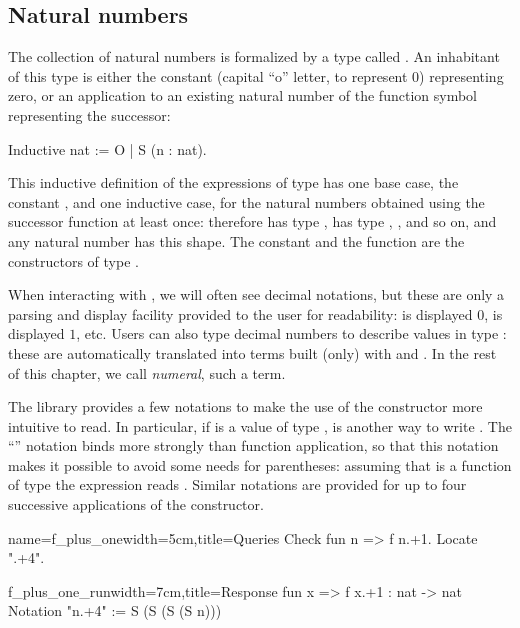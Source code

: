 \subsection{Natural numbers}
\label{ssec:nat}

The collection of natural numbers is formalized by a type called
. An inhabitant of this type is either the constant 
(capital ``o'' letter, to represent $0$) representing zero, or an
application to an existing natural number of the function symbol 
representing the successor:

\begin{coq}{}{}
Inductive nat := O | S (n : nat).
\end{coq}

This inductive definition of the expressions of type  has one
base case, the constant , and one inductive case, for the natural
numbers obtained using the successor function at least once: therefore
 has type ,  has type , , and
so on, and any natural number has this shape. The constant  and
the function  are the constructors of type .

When interacting with
\Coq{}, we will often see decimal
notations, but these are only a parsing and display
facility provided to the user for readability:  is displayed
$0$,  is displayed $1$, etc.  Users can also type decimal
numbers to describe values in type : these are automatically
translated into terms built (only) with  and . In the rest
of this chapter, we call \emph{numeral}, such a term.

The \mcbMC{} library provides a few notations to make the use of the
constructor  more intuitive to read.  In particular, if 
is a value of type ,  is another way to write
.  The ``'' notation binds more strongly than function
application, so that this notation makes it possible to avoid some
needs for parentheses: assuming  that  is a function of type
 the expression  reads
. Similar notations are provided for up to four
successive applications of the  constructor.

\begin{coq}{name=f_plus_one}{width=5cm,title=Queries}
Check fun n => f n.+1.
Locate ".+4".
\end{coq}
\begin{coqout}{f_plus_one_run}{width=7cm,title=Response}
fun x => f x.+1 : nat -> nat
Notation "n.+4" := S (S (S (S n)))
\end{coqout}

